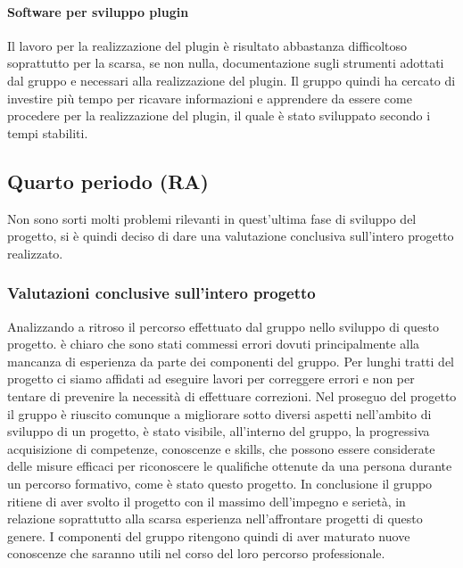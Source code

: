 \documentclass[../piano-di-qualifica.tex]{subfiles}
\begin{document}
\paragraph{Software per sviluppo plugin}
\label{sub:software_sviluppo_plugin}
Il lavoro per la realizzazione del plugin è risultato abbastanza difficoltoso soprattutto per la scarsa, se non nulla, documentazione sugli strumenti adottati dal gruppo e necessari alla realizzazione del plugin.
Il gruppo quindi ha cercato di investire più tempo per ricavare informazioni e apprendere da essere come procedere per la realizzazione del plugin, il quale è stato sviluppato secondo i tempi stabiliti. 

\subsection{Quarto periodo (RA)}
\label{sub:quarto_periodo_ra}
Non sono sorti molti problemi rilevanti in quest'ultima fase di sviluppo del progetto, si è quindi deciso di dare una valutazione conclusiva sull'intero progetto realizzato.

\subsubsection{Valutazioni conclusive sull'intero progetto}
\label{sssec:valutazioni_conclusive}
Analizzando a ritroso il percorso effettuato dal gruppo nello sviluppo di questo progetto. è chiaro che sono stati commessi errori dovuti principalmente alla mancanza di esperienza da parte dei componenti del gruppo.
Per lunghi tratti del progetto ci siamo affidati ad eseguire lavori per correggere errori e non per tentare di prevenire la necessità di effettuare correzioni.
Nel proseguo del progetto il gruppo è riuscito comunque a migliorare sotto diversi aspetti nell'ambito di sviluppo di un progetto, è stato visibile, all'interno del gruppo, la progressiva acquisizione di competenze, conoscenze e skills, che possono essere considerate delle misure efficaci 
per riconoscere le qualifiche ottenute da una persona durante un percorso formativo, come è stato questo progetto.
In conclusione il gruppo ritiene di aver svolto il progetto con il massimo dell'impegno e serietà, in relazione soprattutto alla scarsa esperienza nell'affrontare progetti di questo genere. I componenti del gruppo ritengono quindi di aver maturato nuove conoscenze che saranno utili nel corso del loro percorso professionale.
\end{document}
